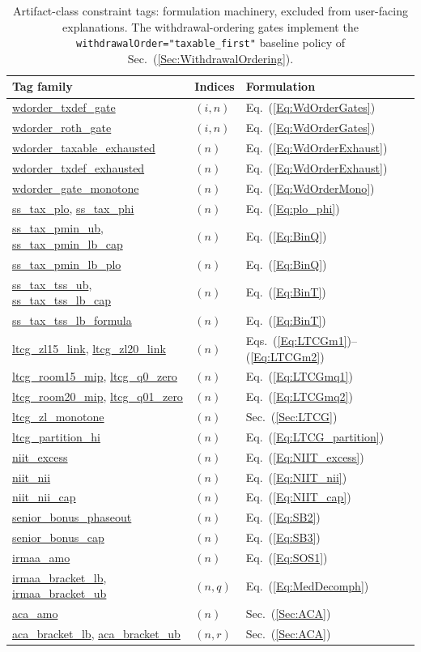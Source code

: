 \documentclass[fleqn,12pt]{report}
\newcommand{\code}[1]{\url{#1}}
\begin{document}
\begin{table}[hbt!]
\centering\footnotesize
\begin{tabular}{lll}
\hline
Tag family & Indices & Formulation \\
\hline
\code{wdorder_txdef_gate} & $(i,n)$ & Eq.~(\ref{Eq:WdOrderGates}) \\
\code{wdorder_roth_gate} & $(i,n)$ & Eq.~(\ref{Eq:WdOrderGates}) \\
\code{wdorder_taxable_exhausted} & $(n)$ & Eq.~(\ref{Eq:WdOrderExhaust}) \\
\code{wdorder_txdef_exhausted} & $(n)$ & Eq.~(\ref{Eq:WdOrderExhaust}) \\
\code{wdorder_gate_monotone} & $(n)$ & Eq.~(\ref{Eq:WdOrderMono}) \\
\code{ss_tax_plo}, \code{ss_tax_phi} & $(n)$ & Eq.~(\ref{Eq:plo_phi}) \\
\code{ss_tax_pmin_ub}, \code{ss_tax_pmin_lb_cap} & $(n)$ & Eq.~(\ref{Eq:BinQ}) \\
\code{ss_tax_pmin_lb_plo} & $(n)$ & Eq.~(\ref{Eq:BinQ}) \\
\code{ss_tax_tss_ub}, \code{ss_tax_tss_lb_cap} & $(n)$ & Eq.~(\ref{Eq:BinT}) \\
\code{ss_tax_tss_lb_formula} & $(n)$ & Eq.~(\ref{Eq:BinT}) \\
\code{ltcg_zl15_link}, \code{ltcg_zl20_link} & $(n)$ & Eqs.~(\ref{Eq:LTCGm1})--(\ref{Eq:LTCGm2}) \\
\code{ltcg_room15_mip}, \code{ltcg_q0_zero} & $(n)$ & Eq.~(\ref{Eq:LTCGmq1}) \\
\code{ltcg_room20_mip}, \code{ltcg_q01_zero} & $(n)$ & Eq.~(\ref{Eq:LTCGmq2}) \\
\code{ltcg_zl_monotone} & $(n)$ & Sec.~(\ref{Sec:LTCG}) \\
\code{ltcg_partition_hi} & $(n)$ & Eq.~(\ref{Eq:LTCG_partition}) \\
\code{niit_excess} & $(n)$ & Eq.~(\ref{Eq:NIIT_excess}) \\
\code{niit_nii} & $(n)$ & Eq.~(\ref{Eq:NIIT_nii}) \\
\code{niit_nii_cap} & $(n)$ & Eq.~(\ref{Eq:NIIT_cap}) \\
\code{senior_bonus_phaseout} & $(n)$ & Eq.~(\ref{Eq:SB2}) \\
\code{senior_bonus_cap} & $(n)$ & Eq.~(\ref{Eq:SB3}) \\
\code{irmaa_amo} & $(n)$ & Eq.~(\ref{Eq:SOS1}) \\
\code{irmaa_bracket_lb}, \code{irmaa_bracket_ub} & $(n,q)$ & Eq.~(\ref{Eq:MedDecomph}) \\
\code{aca_amo} & $(n)$ & Sec.~(\ref{Sec:ACA}) \\
\code{aca_bracket_lb}, \code{aca_bracket_ub} & $(n,r)$ & Sec.~(\ref{Sec:ACA}) \\
\hline
\end{tabular}
\caption{Artifact-class constraint tags: formulation machinery, excluded from
user-facing explanations. The withdrawal-ordering gates implement the
\texttt{withdrawalOrder="taxable\_first"} baseline policy of
Sec.~(\ref{Sec:WithdrawalOrdering}).}
\label{Tab:TagsArtifact}
\end{table}
\end{document}
